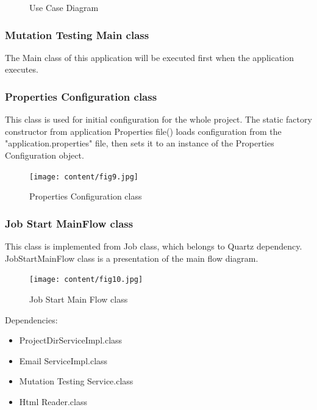 \begin{figure}[h!]
\caption{Use Case Diagram}
\label{fig:f11}
\end{figure}



\subsubsection{Mutation Testing Main class}
The Main class of this application will be executed first when the application executes.
\subsubsection{Properties Configuration class}
This class is used for initial configuration for the whole project. The static factory constructor from application Properties file() loads configuration from the "application.properties" file, then sets it to an instance of the Properties Configuration object.
\begin{figure}[h!]
	\centering
	\texttt{[image: content/fig9.jpg]}
	\caption{Properties Configuration class}
	\label{fig:f11}
\end{figure}
\subsubsection{Job Start MainFlow class}
This class is implemented from Job class, which belongs to Quartz dependency. JobStartMainFlow class is a presentation of the main flow diagram.
\begin{figure}[hb]
	\centering
	\texttt{[image: content/fig10.jpg]}
	\caption{Job Start Main Flow class}
	\label{fig:f11}
\end{figure}

Dependencies:
\begin{itemize}
 \item ProjectDirServiceImpl.class
\item Email ServiceImpl.class
\item Mutation Testing Service.class
\item Html Reader.class
\end{itemize}

